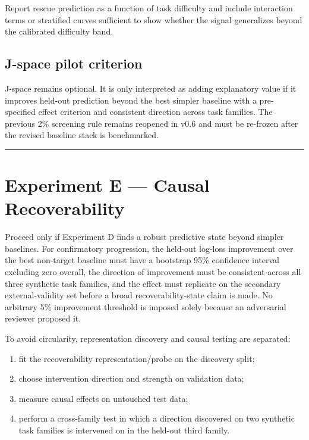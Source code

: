 Report rescue prediction as a function of task difficulty and include interaction terms or stratified curves sufficient to show whether the signal generalizes beyond the calibrated difficulty band.

\subsection{J-space pilot criterion}\label{j-space-pilot-criterion}

J-space remains optional. It is only interpreted as adding explanatory value if it improves held-out prediction beyond the best simpler baseline with a pre-specified effect criterion and consistent direction across task families. The previous 2\% screening rule remains reopened in v0.6 and must be re-frozen after the revised baseline stack is benchmarked.

\begin{center}\rule{0.5\linewidth}{0.5pt}\end{center}



\section{Experiment E --- Causal Recoverability}\label{experiment-e-causal-recoverability}

Proceed only if Experiment D finds a robust predictive state beyond simpler baselines. For confirmatory progression, the held-out log-loss improvement over the best non-target baseline must have a bootstrap 95\% confidence interval excluding zero overall, the direction of improvement must be consistent across all three synthetic task families, and the effect must replicate on the secondary external-validity set before a broad recoverability-state claim is made. No arbitrary 5\% improvement threshold is imposed solely because an adversarial reviewer proposed it.

To avoid circularity, representation discovery and causal testing are separated:

\begin{enumerate}
\tightlist
\item fit the recoverability representation/probe on the discovery split;
\item choose intervention direction and strength on validation data;
\item measure causal effects on untouched test data;
\item perform a cross-family test in which a direction discovered on two synthetic task families is intervened on in the held-out third family.
\end{enumerate}

